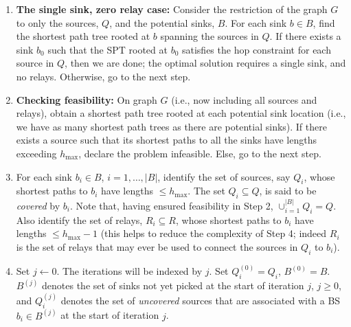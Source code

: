 \documentclass[conference]{IEEEtran}
\begin{document}
\begin{enumerate}
\item \label{step:zero-relay}\textbf{The single sink, zero relay case: }Consider the restriction of the graph $G$ to only the sources, $Q$, and the potential sinks, $B$. For each sink $b\in B$, find the shortest path tree rooted at $b$ spanning the sources in $Q$. If there exists a sink $b_0$ such that the SPT rooted at $b_0$ satisfies the hop constraint for each source in $Q$, then we are done; the optimal solution requires a single sink, and no relays. Otherwise, go to the next step.
\item \label{step:spt}\textbf{Checking feasibility: }On graph $G$ (i.e., now including all sources and relays), obtain a shortest path tree rooted at each potential sink location (i.e., we have as many shortest path trees as there are potential sinks). If there exists a source such that its shortest paths to all the sinks have lengths exceeding $h_{\max}$, declare the problem infeasible. Else, go to the next step.
\item For each sink $b_i\in B$, $i=1,\ldots,|B|$, identify the set of sources, say $Q_i$, whose shortest paths to $b_i$ have lengths $\leq h_{\max}$. The set $Q_i\subseteq Q$, is said to be \emph{covered} by $b_i$. Note that, having ensured feasibility in Step 2, $\cup_{i=1}^{|B|}Q_i=Q$. Also identify the set of relays, $R_i\subseteq R$, whose shortest paths to $b_i$ have lengths $\leq h_{\max}-1$ (this helps to reduce the complexity of Step 4; indeed $R_i$ is the set of relays that may ever be used to connect the sources in $Q_i$ to $b_i$). 
\item Set $j\leftarrow 0$. The iterations will be indexed by $j$. Set $Q_i^{(0)} = Q_i$, $B^{(0)}=B$. $B^{(j)}$ denotes the set of sinks not yet picked at the start of iteration $j$, $j\geq 0$, and $Q_i^{(j)}$ denotes the set of \emph{uncovered} sources that are associated with a BS $b_i\in B^{(j)}$ at the start of iteration $j$.


\end{enumerate}
\end{document}

